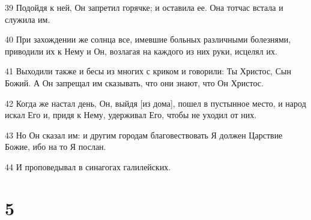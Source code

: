 \par 39 Подойдя к ней, Он запретил горячке; и оставила ее. Она тотчас встала и служила им.
\par 40 При захождении же солнца все, имевшие больных различными болезнями, приводили их к Нему и Он, возлагая на каждого из них руки, исцелял их.
\par 41 Выходили также и бесы из многих с криком и говорили: Ты Христос, Сын Божий. А Он запрещал им сказывать, что они знают, что Он Христос.
\par 42 Когда же настал день, Он, выйдя [из дома], пошел в пустынное место, и народ искал Его и, придя к Нему, удерживал Его, чтобы не уходил от них.
\par 43 Но Он сказал им: и другим городам благовествовать Я должен Царствие Божие, ибо на то Я послан.
\par 44 И проповедывал в синагогах галилейских.

\chapter{5}

